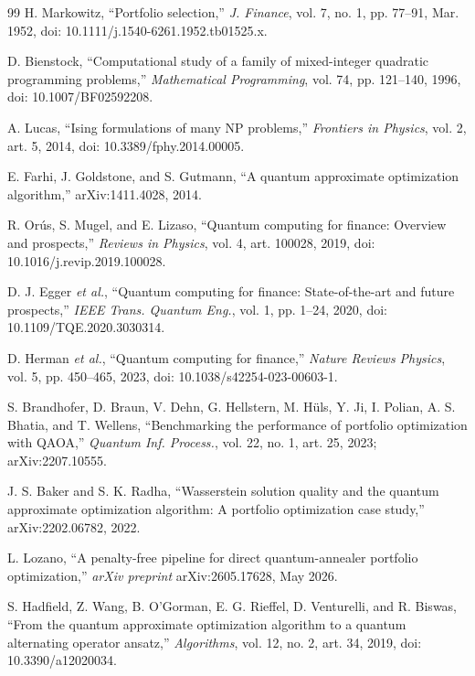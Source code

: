 \documentclass{ieeeaccess}
\begin{document}
\begin{thebibliography}{99}
 H. Markowitz, ``Portfolio selection,'' \textit{J. Finance}, vol. 7, no. 1, pp. 77--91, Mar. 1952, doi: 10.1111/j.1540-6261.1952.tb01525.x.

 D. Bienstock, ``Computational study of a family of mixed-integer quadratic programming problems,'' \textit{Mathematical Programming}, vol. 74, pp. 121--140, 1996, doi: 10.1007/BF02592208.

 A. Lucas, ``Ising formulations of many NP problems,'' \textit{Frontiers in Physics}, vol. 2, art. 5, 2014, doi: 10.3389/fphy.2014.00005.

 E. Farhi, J. Goldstone, and S. Gutmann, ``A quantum approximate optimization algorithm,'' arXiv:1411.4028, 2014.

 R. Or\'{u}s, S. Mugel, and E. Lizaso, ``Quantum computing for finance: Overview and prospects,'' \textit{Reviews in Physics}, vol. 4, art. 100028, 2019, doi: 10.1016/j.revip.2019.100028.

 D. J. Egger \textit{et al.}, ``Quantum computing for finance: State-of-the-art and future prospects,'' \textit{IEEE Trans. Quantum Eng.}, vol. 1, pp. 1--24, 2020, doi: 10.1109/TQE.2020.3030314.

 D. Herman \textit{et al.}, ``Quantum computing for finance,'' \textit{Nature Reviews Physics}, vol. 5, pp. 450--465, 2023, doi: 10.1038/s42254-023-00603-1.

 S. Brandhofer, D. Braun, V. Dehn, G. Hellstern, M. H\"{u}ls, Y. Ji, I. Polian, A. S. Bhatia, and T. Wellens, ``Benchmarking the performance of portfolio optimization with QAOA,'' \textit{Quantum Inf. Process.}, vol. 22, no. 1, art. 25, 2023; arXiv:2207.10555.

 J. S. Baker and S. K. Radha, ``Wasserstein solution quality and the quantum approximate optimization algorithm: A portfolio optimization case study,'' arXiv:2202.06782, 2022.

 L. Lozano, ``A penalty-free pipeline for direct quantum-annealer portfolio optimization,'' \textit{arXiv preprint} arXiv:2605.17628, May 2026.

 S. Hadfield, Z. Wang, B. O'Gorman, E. G. Rieffel, D. Venturelli, and R. Biswas, ``From the quantum approximate optimization algorithm to a quantum alternating operator ansatz,'' \textit{Algorithms}, vol. 12, no. 2, art. 34, 2019, doi: 10.3390/a12020034.


\end{thebibliography}
\end{document}
